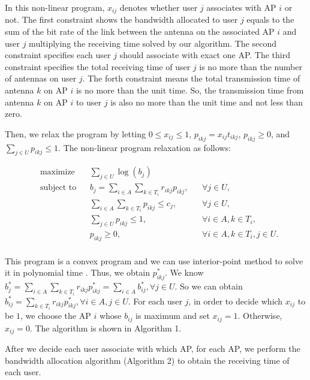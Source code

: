 	In this non-linear program, $x_{ij}$ denotes whether user $j$ associates with AP $i$ or not. The first constraint shows the bandwidth allocated to user $j$ equals to the sum of the bit rate of the link between the antenna on the associated AP $i$ and user $j$ multiplying the receiving time solved by our algorithm. The second constraint specifies each user $j$ should associate with exact one AP. The third constraint specifies the total receiving time of user $j$ is no more than the number of antennas on user $j$. The forth constraint means the total transmission time of antenna $k$ on AP $i$ is no more than the unit time. So, the transmission time from antenna $k$ on AP $i$ to user $j$ is also no more than the unit time and not less than zero.
	
	Then, we relax the program by letting $0 \le x_{ij} \le 1$, $p_{ikj} = x_{ij} t_{ikj}$, $p_{ikj} \ge 0$, and $\sum_{j \in U} p_{ikj} \le 1$. The non-linear program relaxation as follows:
	
	\begin{equation} \label{eq:cvxpr}
		\begin{aligned}
			& \text{maximize} 
			& & \sum_{j \in U} \log (b_{j}) \\
			& \text{subject to} 
			& & b_{j} = \sum_{i \in A} \sum_{k \in T_{i}} r_{ikj} p_{ikj}, & & \forall j \in U, \\
			& & & \sum_{i \in A} \sum_{k \in T_i } p_{ikj} \le c_j, & & \forall j \in U, \\
			& & & \sum_{j\in U} p_{ikj} \le 1, & & \forall i \in A, k \in T_i,  \\
			& & & p_{ikj} \ge 0, & & \forall i \in A, k \in T_i, j \in U. \\
		\end{aligned}
	\end{equation}

	This program is a convex program and we can use interior-point method to solve it in polynomial time \cite{boyd2004convex}. Thus, we obtain $p_{ikj}^{*}$. We know $b_j^* = \sum_{i \in A} \sum_{k \in T_{i}} r_{ikj} p_{ikj}^* = \sum_{i \in A} b_{ij}^*, \forall j \in U$. So we can obtain $b_{ij}^* = \sum_{k \in T_{i}} r_{ikj} p_{ikj}^*, \forall i \in A, j \in U$. For each user $j$, in order to decide which $x_{ij}$ to be $1$, we choose the AP $i$ whose $b_{ij}$ is maximum and set $x_{ij} = 1$. Otherwise, $x_{ij} = 0$. The algorithm is shown in Algorithm 1.
	
	After we decide each user associate with which AP, for each AP, we perform the bandwidth allocation algorithm (Algorithm 2) to obtain the receiving time of each user.
	
